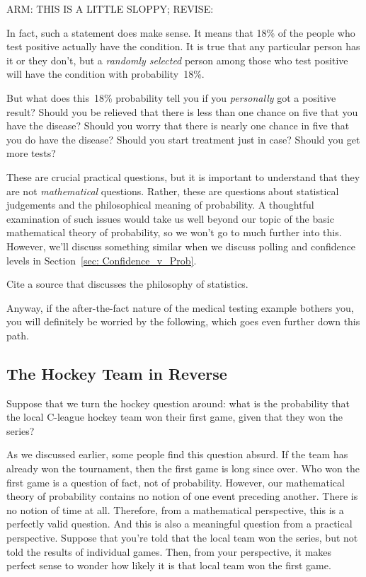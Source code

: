 \begin{editingnotes}
ARM: THIS IS A LITTLE SLOPPY; REVISE:
\end{editingnotes}

In fact, such a statement does make sense.  It means that 18\% of the
people who test positive actually have the condition.  It is true that
any particular person has it or they don't, but a \emph{randomly
  selected} person among those who test positive will have the
condition with probability~18\%.

But what does this~18\% probability tell you if you \emph{personally}
got a positive result?  Should you be relieved that there is less than
one chance on five that you have the disease?  Should you worry that
there is nearly one chance in five that you do have the disease?
Should you start treatment just in case?  Should you get more tests?

These are crucial practical questions, but it is important to
understand that they are not \emph{mathematical} questions.  Rather,
these are questions about statistical judgements and the philosophical
meaning of probability.  A thoughtful examination of such issues would
take us well beyond our topic of the basic mathematical theory of
probability, so we won't go to much further into this.  However, we'll
discuss something similar when we discuss polling and confidence
levels in Section~\ref{sec: Confidence_v_Prob}.

\begin{editingnotes}
Cite a source that discusses the philosophy of statistics.
\end{editingnotes}

Anyway, if the after-the-fact nature of the medical testing example
bothers you, you will definitely be worried by the following,
which goes even further down this path.

\subsection{The Hockey Team in Reverse}

Suppose that we turn the hockey question around: what is the
probability that the local C-league hockey team won their first game,
given that they won the series?

As we discussed earlier, some people find this question absurd.  If
the team has already won the tournament, then the first game is long
since over.  Who won the first game is a question of fact, not of
probability.  However, our mathematical theory of probability contains
no notion of one event preceding another.  There is no notion of time
at all.  Therefore, from a mathematical perspective, this is a
perfectly valid question.  And this is also a meaningful question from
a practical perspective.  Suppose that you're told that the local team
won the series, but not told the results of individual games.  Then,
from your perspective, it makes perfect sense to wonder how likely it
is that local team won the first game.

